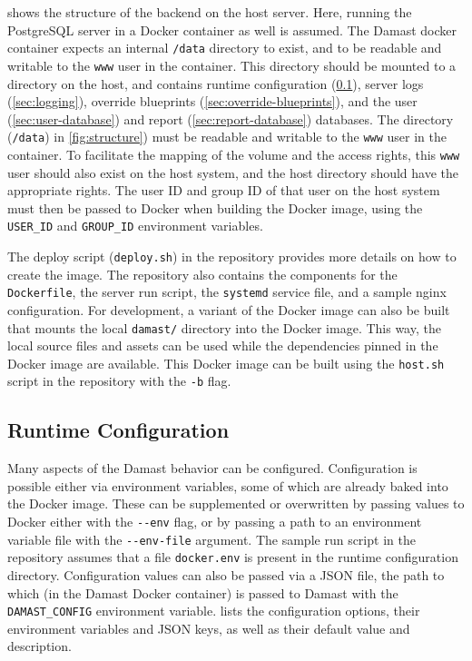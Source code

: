  shows the structure of the backend on the host server.
Here, running the PostgreSQL server in a Docker container as well is assumed.
The Damast docker container expects an internal \verb!/data! directory to exist, and to be readable and writable to the \verb!www! user in the container.
This directory should be mounted to a directory on the host, and contains runtime configuration (\cref{sec:runtime-configuration}), server logs (\cref{sec:logging}), override blueprints (\cref{sec:override-blueprints}), and the user (\cref{sec:user-database}) and report (\cref{sec:report-database}) databases.
The directory (\verb!/data!) in \cref{fig:structure}) must be readable and writable to the \verb!www! user in the container.
To facilitate the mapping of the volume and the access rights, this \verb!www! user should also exist on the host system, and the host directory should have the appropriate rights.
The user ID and group ID of that user on the host system must then be passed to Docker when building the Docker image, using the \verb!USER_ID! and \verb!GROUP_ID! environment variables.

The deploy script (\verb!deploy.sh!) in the repository provides more details on how to create the image.
The repository also contains the components for the \verb!Dockerfile!, the server run script, the \verb!systemd! service file, and a sample nginx configuration.
For development, a variant of the Docker image can also be built that mounts the local \verb!damast/! directory into the Docker image.
This way, the local source files and assets can be used while the dependencies pinned in the Docker image are available.
This Docker image can be built using the \verb!host.sh! script in the repository with the \verb!-b! flag.


\subsection{Runtime Configuration}
\label{sec:runtime-configuration}

Many aspects of the Damast behavior can be configured.
Configuration is possible either via environment variables, some of which are already baked into the Docker image.
These can be supplemented or overwritten by passing values to Docker either with the \verb!--env! flag, or by passing a path to an environment variable file with the \verb!--env-file! argument.
The sample run script in the repository assumes that a file \verb!docker.env! is present in the runtime configuration directory.
Configuration values can also be passed via a JSON file, the path to which (in the Damast Docker container) is passed to Damast with the \verb!DAMAST_CONFIG! environment variable.
 lists the configuration options, their environment variables and JSON keys, as well as their default value and description.

